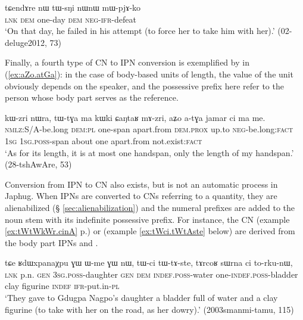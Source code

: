 \begin{exe}
\ex \label{ex:nW.tWsNi}
\gll tɕendɤre nɯ tɯ-sŋi nɯnɯ mɯ-pjɤ-ko \\
\textsc{lnk} \textsc{dem} one-day \textsc{dem} \textsc{neg}-\textsc{ifr}-defeat \\
\glt `On that day, he failed in his attempt (to force her to take him with her).' (02-deluge2012, 73)
\end{exe}
Finally, a fourth type of CN to IPN conversion is exemplified by  in (\ref{ex:aZo.atGa}): in the case of body-based units of length, the value of the unit obviously depends on the speaker, and the possessive prefix here refer to the person whose body part serves as the reference.

\begin{exe}
\ex \label{ex:aZo.atGa}
\gll kɯ-zri nɯra, tɯ-tɣa ma kɯki ɕaŋtaʁ mɤ-zri, aʑo a-tɣa jamar ci ma me. \\
 \textsc{nmlz}:S/A-be.long \textsc{dem}:\textsc{pl} one-span apart.from \textsc{dem}.\textsc{prox} up.to \textsc{neg}-be.long:\textsc{fact} \textsc{1sg} \textsc{1sg}.\textsc{poss}-span about one apart.from not.exist:\textsc{fact} \\
\glt `As for its length, it is at most one handspan, only the length of my handspan.' (28-tshAwAre, 53)
\end{exe}

Conversion from IPN to CN also exists, but is not an automatic process in Japhug. When IPNs are converted to CNs referring to a quantity, they are alienabilized (§ \ref{sec:alienabilization}) and the numeral prefixes are added to the noun stem with its indefinite possessive prefix. For instance, the CN  (example \ref{ex:tWtWkWr.cinA} p.\pageref{ex:tWtWkWr.cinA}) or  (example \ref{ex:tWci.tWtAste} below) are derived from the body part IPNs  and . 

\begin{exe}
\ex \label{ex:tWci.tWtAste}
\gll  tɕe ʁdɯxpanaχpu ɣɯ ɯ-me ɣɯ nɯ, tɯ-ci tɯ-tɤ-ste, tɤrcoʁ sɯrna ci to-rku-nɯ, \\
 \textsc{lnk} p.n. \textsc{gen} \textsc{3sg}.\textsc{poss}-daughter \textsc{gen} \textsc{dem} \textsc{indef}.\textsc{poss}-water one-\textsc{indef}.\textsc{poss}-bladder clay figurine \textsc{indef} \textsc{ifr}-put.in-\textsc{pl} \\
\glt `They gave to Gdugpa Nagpo's daughter a bladder full of water and a clay figurine (to take with her on the road, as her dowry).' (2003smanmi-tamu, 115)
\end{exe}

